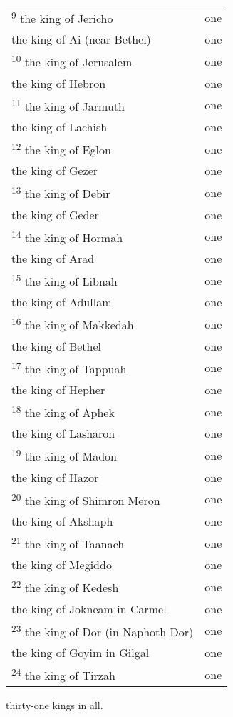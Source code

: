 \documentclass[12pt,twoside]{article}
\newcommand{\vs}[1]{\textsuperscript{#1}}
\begin{document}
\begin{longtable}[l]{@{}ll@{}}
\indent\indent \vs{9} the king of Jericho & one \\
\indent\indent the king of Ai (near Bethel) & one \\
\indent\indent\vs{10} the king of Jerusalem & one \\
\indent\indent the king of Hebron & one \\
\indent\indent\vs{11} the king of Jarmuth & one \\
\indent\indent the king of Lachish & one \\
\indent\indent\vs{12} the king of Eglon & one \\
\indent\indent the king of Gezer & one \\
\indent\indent\vs{13} the king of Debir & one \\
\indent\indent the king of Geder & one \\
\indent\indent\vs{14} the king of Hormah & one \\
\indent\indent the king of Arad & one \\
\indent\indent\vs{15} the king of Libnah & one \\
\indent\indent the king of Adullam & one \\
\indent\indent\vs{16} the king of Makkedah & one \\
\indent\indent the king of Bethel & one \\
\indent\indent\vs{17} the king of Tappuah & one \\
\indent\indent the king of Hepher & one \\
\indent\indent\vs{18} the king of Aphek & one \\
\indent\indent the king of Lasharon & one \\
\indent\indent\vs{19} the king of Madon & one \\
\indent\indent the king of Hazor & one \\
\indent\indent\vs{20} the king of Shimron Meron & one \\
\indent\indent the king of Akshaph & one \\
\indent\indent\vs{21} the king of Taanach & one \\
\indent\indent the king of Megiddo & one \\
\indent\indent\vs{22} the king of Kedesh & one \\
\indent\indent the king of Jokneam in Carmel & one \\
\indent\indent\vs{23} the king of Dor (in Naphoth Dor) & one \\
\indent\indent the king of Goyim in Gilgal & one \\
\indent\indent\vs{24} the king of Tirzah & one
\end{longtable}
\indent thirty-one kings in all.
\end{document}
